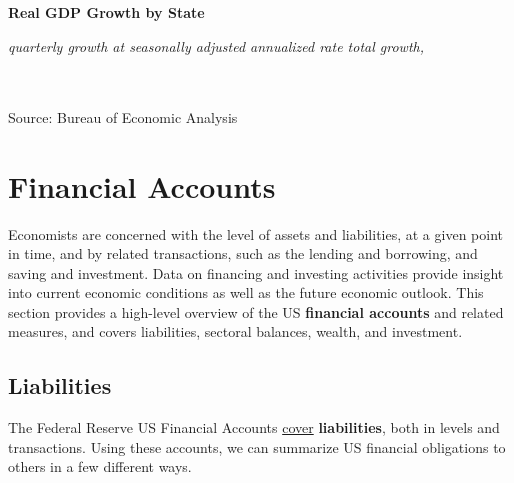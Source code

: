 \documentclass{report}
\begin{document}
\normalsize \textbf{Real GDP Growth by State}\\
\footnotesize{\textit{quarterly growth at seasonally adjusted annualized rate \hspace{20mm} total growth, }\\ 

\vspace{-4.5mm}
\hspace{-3mm} \noindent {} \setlength{\tabcolsep}{2.0pt} \color{black!90}
		{\renewcommand{\arraystretch}{1.44}
		 \begin{tabular}{p{29mm} R{8.5mm} R{8.5mm} R{8.5mm} R{8.5mm} R{8.5mm} p{0mm} R{11mm} R{11mm} R{12mm} }
		 \hline
		\end{tabular}}	\\

\vspace{-3mm}	
\footnotesize{Source: Bureau of Economic Analysis}
\newpage
\hypertarget{ofa}{\label{ofa}} \vspace{-3mm}
\section*{Financial Accounts} 
\begin{minipage}{0.76\textwidth}  
\vspace{-3mm}

\small Economists are concerned with the level of assets and liabilities, at a given point in time, and by related transactions, such as the lending and borrowing, and saving and investment. Data on financing and investing activities provide insight into current economic conditions as well as the future economic outlook. This section provides a high-level overview of the US \textbf{financial accounts} and related measures, and covers liabilities, sectoral balances, wealth, and investment. 
\hypertarget{ofl}{\label{ofl}}
\subsection*{Liabilities}  
\small The Federal Reserve US Financial Accounts \href{https://www.federalreserve.gov/releases/z1/}{cover} \textbf{liabilities}, both in levels and transactions. Using these accounts, we can summarize US financial obligations to others in a few different ways. 


\end{minipage}}
\end{document}
